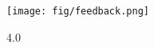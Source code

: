 \documentclass[xcolor=table,t]{beamer}
\begin{document}
\begin{frame}[plain]
    \begin{minipage}[c][.9\textheight][t]{\textwidth}
        \centering
        \vspace{0.2\textheight}
        \texttt{[image: fig/feedback.png]}%
    \end{minipage}
    \begin{minipage}{\textwidth}
        \centering
        \ccby\hspace{3pt}4.0
    \end{minipage}
\end{frame}
\end{document}
